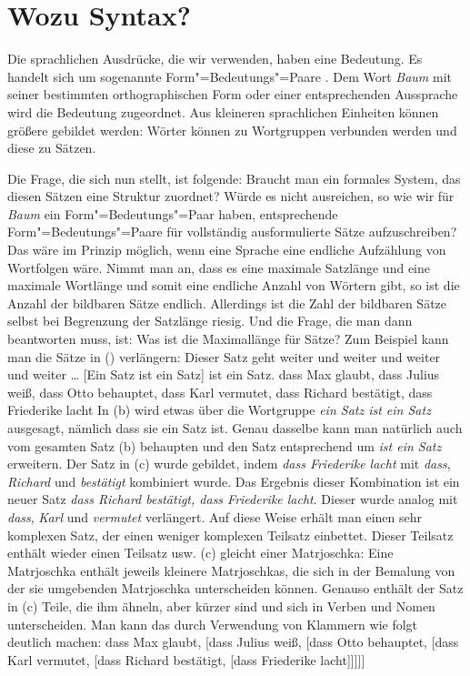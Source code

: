 \documentclass[ number=45
			   ,series=eotms
			   ,printondemand
			  ]{langsci}
\begin{document}
\section{Wozu Syntax?}
\label{sec-wozu-syntax}

Die sprachlichen Ausdrücke, die wir verwenden, haben eine Bedeutung. Es handelt
sich um sogenannte Form"=Bedeutungs"=Paare \citep{Saussure16a}. Dem Wort \emph{Baum}
mit seiner bestimmten orthographischen Form oder einer entsprechenden Aussprache
wird die Bedeutung  zugeordnet. Aus kleineren sprachlichen Einheiten
können größere gebildet werden: Wörter können zu Wortgruppen verbunden werden
und diese zu Sätzen.

Die Frage, die sich nun stellt, ist folgende: Braucht man ein formales System, das
diesen Sätzen eine Struktur zuordnet? Würde es nicht ausreichen, so wie wir
für \emph{Baum} ein Form"=Bedeutungs"=Paar haben, entsprechende Form"=Bedeutungs"=Paare
für vollständig ausformulierte Sätze aufzuschreiben? Das wäre im Prinzip möglich, wenn eine Sprache eine
endliche Aufzählung von Wortfolgen wäre. Nimmt man an,
dass es eine maximale Satzlänge und eine maximale Wortlänge und somit eine endliche
Anzahl von Wörtern gibt, so ist die Anzahl der bildbaren Sätze endlich.
Allerdings ist die Zahl der bildbaren Sätze selbst bei Begrenzung der Satzlänge riesig.
Und die Frage, die man dann beantworten muss, ist: Was ist die Maximallänge für
Sätze? Zum Beispiel kann man die Sätze in () verlängern:
\eal
\ex Dieser Satz geht weiter und weiter und weiter und weiter \ldots
\ex {}[Ein Satz ist ein Satz] ist ein Satz.
\ex\label{einbettung-dass-Saetze} dass Max glaubt, dass Julius weiß, dass Otto behauptet, dass Karl vermutet, dass Richard bestätigt,
dass Friederike lacht
\zl
In (b) wird etwas über die Wortgruppe \emph{ein Satz ist ein Satz} ausgesagt, nämlich dass sie
ein Satz ist. Genau dasselbe kann man natürlich auch vom gesamten Satz (b) behaupten und den Satz
entsprechend um \emph{ist ein Satz} erweitern. Der Satz in (c) wurde gebildet, indem
\emph{dass Friederike lacht} mit \emph{dass}, \emph{Richard} und \emph{bestätigt} kombiniert
wurde. Das Ergebnis dieser Kombination ist ein neuer Satz \emph{dass Richard bestätigt,
dass Friederike lacht}. Dieser wurde analog mit \emph{dass}, \emph{Karl} und \emph{vermutet}
verlängert. Auf diese Weise erhält man einen sehr komplexen Satz, der einen weniger komplexen
Teilsatz einbettet. Dieser Teilsatz enthält wieder einen Teilsatz usw. (c) gleicht einer
Matrjoschka: Eine Matrjoschka enthält jeweils kleinere Matrjoschkas, die sich in der Bemalung von
der sie umgebenden Matrjoschka unterscheiden können. Genauso enthält der Satz in (c) Teile,
die ihm ähneln, aber kürzer sind und sich in Verben und Nomen unterscheiden. Man kann das durch
Verwendung von Klammern wie folgt deutlich machen:
\ea
dass Max glaubt, [dass Julius weiß, [dass Otto behauptet, [dass Karl vermutet, [dass Richard bestätigt,
[dass Friederike lacht]]]]]
\z
\end{document}

